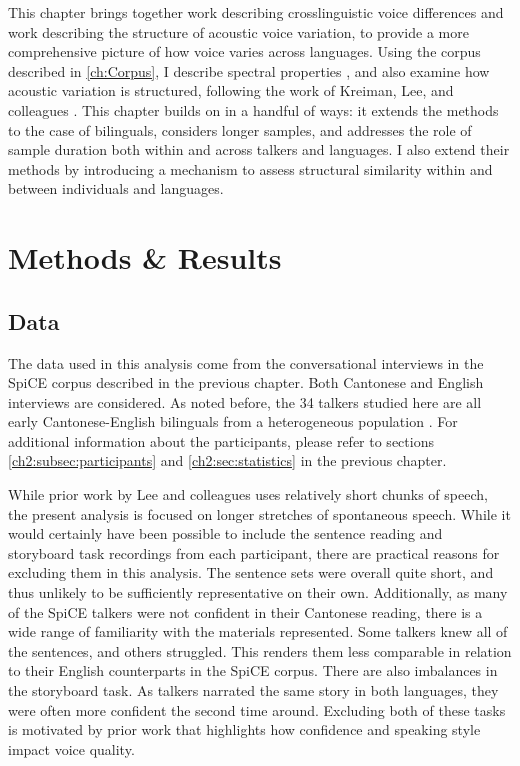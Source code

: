 This chapter brings together work describing crosslinguistic voice differences and work describing the structure of acoustic voice variation, to provide a more comprehensive picture of how voice varies across languages. Using the corpus described in \ref{ch:Corpus}, I describe spectral properties \citet[e.g.][]{ng_2012_ltas}, and also examine how acoustic variation is structured, following the work of Kreiman, Lee, and colleagues \citep{kreiman_2014_theory,lee_2019_acoustic}. This chapter builds on \citet{lee_2019_acoustic} in a handful of ways: it extends the methods to the case of bilinguals, considers longer samples, and addresses the role of sample duration both within and across talkers and languages. I also extend their methods by introducing a mechanism to assess structural similarity within and between individuals and languages.


\section{Methods \& Results}\label{ch3:sec:methods_results}
\subsection{Data}\label{ch3:sec:data}
The data used in this analysis come from the conversational interviews in the SpiCE corpus described in the previous chapter. Both Cantonese and English interviews are considered. As noted before, the 34 talkers studied here are all early Cantonese-English bilinguals from a heterogeneous population \citep{liang_2015_china}. For additional information about the participants, please refer to sections \ref{ch2:subsec:participants} and \ref{ch2:sec:statistics} in the previous chapter. 

While prior work by Lee and colleagues \citep{} uses relatively short chunks of speech, the present analysis is focused on longer stretches of spontaneous speech. While it would certainly have been possible to include the sentence reading and storyboard task recordings from each participant, there are practical reasons for excluding them in this analysis. The sentence sets were overall quite short, and thus unlikely to be sufficiently representative on their own. Additionally, as many of the SpiCE talkers were not confident in their Cantonese reading, there is a wide range of familiarity with the materials represented. Some talkers knew all of the sentences, and others struggled. This renders them less comparable in relation to their English counterparts in the SpiCE corpus. There are also imbalances in the storyboard task. As talkers narrated the same story in both languages, they were often more confident the second time around. Excluding both of these tasks is motivated by prior work that highlights how confidence \citep{jarvinen_2013_speaking} and speaking style \citep{lee_2017_bilingual} impact voice quality. 


